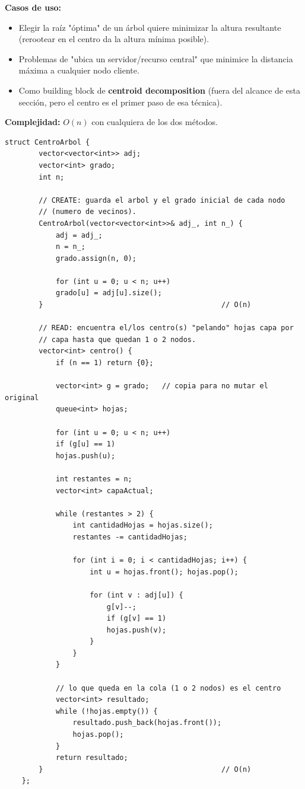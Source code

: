 \documentclass[10pt,a4paper,twocolumn]{article}
\begin{document}
\textbf{Casos de uso:}

\begin{itemize}
	\item Elegir la raíz "óptima" de un árbol quiere minimizar la
	altura resultante (rerootear en el centro da la altura mínima
	posible).
	\item Problemas de "ubica un servidor/recurso central" que
	minimice la distancia máxima a cualquier nodo cliente.
	\item Como building block de \textbf{centroid decomposition}
	(fuera del alcance de esta sección, pero el centro es el primer
	paso de esa técnica).
\end{itemize}

\textbf{Complejidad:} $O(n)$ con cualquiera de los dos métodos.

\begin{lstlisting}[style=cpp]
	struct CentroArbol {
		vector<vector<int>> adj;
		vector<int> grado;
		int n;
		
		// CREATE: guarda el arbol y el grado inicial de cada nodo
		// (numero de vecinos).
		CentroArbol(vector<vector<int>>& adj_, int n_) {
			adj = adj_;
			n = n_;
			grado.assign(n, 0);
			
			for (int u = 0; u < n; u++)
			grado[u] = adj[u].size();
		}                                          // O(n)
		
		// READ: encuentra el/los centro(s) "pelando" hojas capa por
		// capa hasta que quedan 1 o 2 nodos.
		vector<int> centro() {
			if (n == 1) return {0};
			
			vector<int> g = grado;   // copia para no mutar el original
			queue<int> hojas;
			
			for (int u = 0; u < n; u++)
			if (g[u] == 1)
			hojas.push(u);
			
			int restantes = n;
			vector<int> capaActual;
			
			while (restantes > 2) {
				int cantidadHojas = hojas.size();
				restantes -= cantidadHojas;
				
				for (int i = 0; i < cantidadHojas; i++) {
					int u = hojas.front(); hojas.pop();
					
					for (int v : adj[u]) {
						g[v]--;
						if (g[v] == 1)
						hojas.push(v);
					}
				}
			}
			
			// lo que queda en la cola (1 o 2 nodos) es el centro
			vector<int> resultado;
			while (!hojas.empty()) {
				resultado.push_back(hojas.front());
				hojas.pop();
			}
			return resultado;
		}                                          // O(n)
	};
\end{lstlisting}
\end{document}
